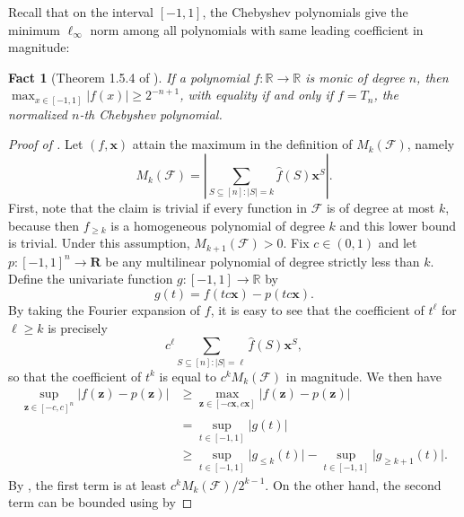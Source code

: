 \documentclass[10pt,a4paper]{article}
\newtheorem{fact}[theorem]{Fact}
\theoremstyle{definition}
\begin{document}
Recall that on the interval $[-1,1]$, the Chebyshev polynomials give the minimum $\ell_{\infty}$ norm among all polynomials with same leading coefficient in magnitude:

\begin{fact}[Theorem 1.5.4 of \cite{rahman2002analytic}]
\label{fact:cheb3}
If a polynomial $f:\mathbb{R}\to \mathbb{R}$ is monic of degree $n$, then $\max_{x\in [-1,1]} \vert f(x)\vert\geq 2^{-n+1}$, with equality if and only if $f=T_n$, the normalized $n$-th Chebyshev polynomial.
\end{fact}

\begin{proof}[Proof of ]
Let $(f,\mathbf{x})$ attain the maximum in the definition of $M_k(\mathcal{F})$, namely
\begin{equation*}
    M_k(\mathcal{F}) = \left\vert \sum_{S\subseteq [n]:\vert S\vert=k} \widehat{f}(S)\mathbf{x}^S\right\vert.
\end{equation*}
First, note that the claim is trivial if every function in $\mathcal{F}$ is of degree at most $k$, because then $f_{\geq k}$ is a homogeneous polynomial of degree $k$ and this lower bound is trivial. Under this assumption, $M_{k+1}(\mathcal{F})>0$. Fix $c\in (0,1)$ and let $p:[-1,1]^n\to \mathbf{R}$ be any multilinear polynomial of degree strictly less than $k$. Define the univariate function $g:[-1,1]\to \mathbb{R}$ by
\begin{equation*}
    g(t) = f(tc\mathbf{x})- p(tc\mathbf{x}).
\end{equation*}
By taking the Fourier expansion of $f$, it is easy to see that the coefficient of $t^{\ell}$ for $\ell\geq k$ is precisely
\begin{equation*}
    c^{\ell}\sum_{S\subseteq [n]:\vert S\vert=\ell} \widehat{f}(S)\mathbf{x}^S,
\end{equation*}
so that the coefficient of $t^k$ is equal to $c^k M_k(\mathcal{F})$ in magnitude.
We then have
\begin{align*}
    \sup_{\mathbf{z}\in [-c,c]^n} \vert f(\mathbf{z})-p(\mathbf{z})\vert&\geq \max_{\mathbf{z}\in [-c\mathbf{x},c\mathbf{x}]} \vert f(\mathbf{z})-p(\mathbf{z})\vert\\
    &=\sup_{t\in [-1,1]} \vert g(t)\vert\\
    &\geq \sup_{t\in [-1,1]} \vert g_{\leq k}(t)\vert - \sup_{t\in [-1,1]} \vert g_{\geq k+1}(t)\vert.
\end{align*}
By , the first term is at least $c^kM_k(\mathcal{F})/2^{k-1}$. On the other hand, the second term can be bounded using  by

\end{proof}
\end{document}

